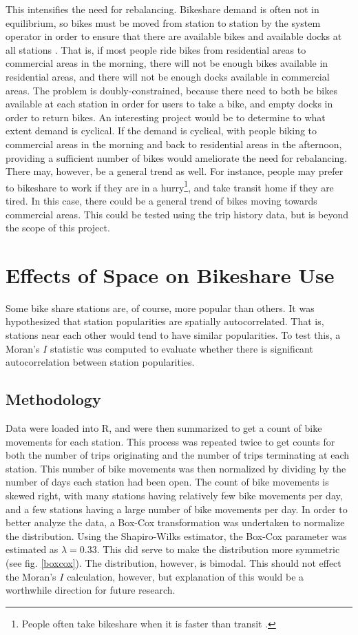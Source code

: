 \documentclass[letterpaper,11pt]{article}
\begin{document}
This intensifies the need for rebalancing. Bikeshare demand is often not
in equilibrium, so bikes must be moved from station to station by the system 
operator in order to ensure that there are available bikes and available docks
at all stations \autocite[108]{IDAE2007}. That is, if most people ride bikes from
residential areas to commercial areas in the morning, there will not be enough bikes
available in residential areas, and there will not be enough docks available in
commercial areas. The problem is doubly-constrained, because there need to both be
bikes available at each station in order for users to take a bike, and empty docks
in order to return bikes. An interesting project would be to determine to what extent
demand is cyclical. If the demand is cyclical, with people biking to 
commercial areas in the morning and back to residential areas in the afternoon,
providing a sufficient number of bikes would ameliorate the need for rebalancing.
There may, however, be a general trend as well. For instance, people may prefer to
bikeshare to work if they are in a hurry\footnote{People often take bikeshare when it is faster than transit 
\autocite{Wong2012}.}, and take transit home if they are tired. In this case, there could be a general trend
of bikes moving towards commercial areas. This could be tested using the trip
history data, but is beyond the scope of this project.

\section{Effects of Space on Bikeshare Use}

Some bike share stations are, of course, more popular than others. It was hypothesized
that station popularities are spatially autocorrelated. That is, stations near each other
would tend to have similar popularities. To test this, a Moran's $I$ statistic was computed to
evaluate whether there is significant autocorrelation between station popularities.

\subsection{Methodology}

Data were loaded into R, and were then summarized to get a count of bike movements for
each station. This process was repeated twice to get counts for both the number of trips originating
and the number of trips terminating at each station. This number of bike movements was then normalized
by dividing by the number of days each station had been open. The count of bike movements is skewed right,
with many stations having relatively few bike movements per day, and a few stations having a large number
of bike movements per day. In order to better analyze the data, a Box-Cox transformation was undertaken
to normalize the distribution. Using the Shapiro-Wilks estimator, the Box-Cox parameter was estimated as
$\lambda = 0.33$. This did serve to make the distribution more symmetric (see fig. \ref{boxcox}). The distribution,
however, is bimodal. This should not effect the Moran's $I$ calculation, however, but explanation of this would
be a worthwhile direction for future research.
\end{document}
